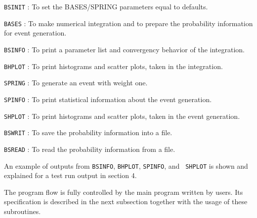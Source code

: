 {\small
\begin{description}
\item{\tt BSINIT} : To set the {\small BASES/SPRING} parameters equal to defaults. 
\item{\tt BASES} : To make numerical integration and to prepare the probability
information for event generation. 
\item{\tt BSINFO} : To print a parameter list and convergency 
behavior of the integration. 
\item{\tt BHPLOT} : To print histograms and scatter plots, taken 
in the integration. 
\item{\tt SPRING} : To generate an event with weight one. 
\item{\tt SPINFO} : To print statistical information about the 
event generation.
\item{\tt SHPLOT} : To print histograms and scatter plots, taken  
in the event generation.
\item{\tt BSWRIT} : To save the probability information into a file.
\item{\tt BSREAD} : To read the probability information from a file.
\end{description}}
 \par
\par\noindent
An example of outputs from {\tt BSINFO}, {\tt BHPLOT}, {\tt SPINFO}, and {\tt
SHPLOT} is shown and explained for a test run output in
section 4.
\par
  The program flow is fully controlled by the main program written by users.
Its specification is described in the next subsection together with the usage of
these subroutines. 
  
